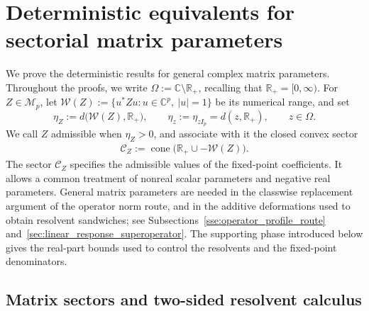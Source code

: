 \documentclass[EJP, preprint, NODS, nobera, nofontexpansion]{ejpecp}
\DeclareMathOperator{\cone}{cone}
\begin{document}
\section{Deterministic equivalents for sectorial matrix parameters}
\label{sec:deterministic_study}

We prove the deterministic results for general complex matrix parameters.
Throughout the proofs, we write
$\Omega:=\mathbb C\setminus\mathbb R_+$, recalling that $\mathbb R_+=[0,\infty)$.
For $Z\in\mathcal M_p$, let
$\mathcal W(Z):=\{u^*Zu:u\in\mathbb C^p,\ |u|=1\}$ be its numerical
range, and set
\[
    \eta_Z:=d\bigl(\mathcal W(Z),\mathbb R_+\bigr),
    \qquad
    \eta_z:=\eta_{zI_p}=d(z,\mathbb R_+),\qquad z\in\Omega.
\]
We call $Z$ admissible when $\eta_Z>0$, and associate with it the closed
convex sector
\begin{align}\label{eq:def_matrix_resolvent_sector}
    \mathcal C_Z:=\cone\bigl(\mathbb R_+\cup-\mathcal W(Z)\bigr).
\end{align}
The sector $\mathcal C_Z$ specifies the admissible values of the
fixed-point coefficients. It allows a common treatment of nonreal
scalar parameters and negative real parameters. General matrix parameters are needed in the classwise replacement
argument of the operator norm route, and in the additive
deformations used to obtain resolvent sandwiches; see
Subsections~\ref{sse:operator_profile_route}
and~\ref{sec:linear_response_superoperator}.
The supporting phase introduced below gives the real-part bounds
used to control the resolvents and the fixed-point denominators.

\subsection{Matrix sectors and two-sided resolvent calculus}
\end{document}
